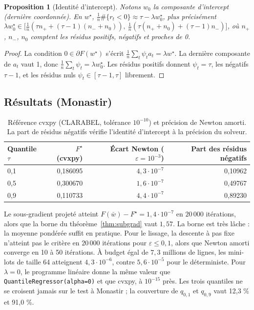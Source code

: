 \documentclass[11pt,a4paper]{article}
\newtheorem{proposition}[theorem]{Proposition}
\theoremstyle{remark}
\theoremstyle{definition}
\begin{document}
\begin{proposition}[Identité d'intercept]\label{prop:intercept}
Notons $w_0$ la composante d'intercept (dernière coordonnée). En $w^\star$, $\frac1n\#\{r_t<0\} \approx \tau - \lambda w_0^\star$, plus précisément
$\lambda w_0^\star \in \bigl[\tfrac1n(\tau n_+ + (\tau-1)(n_- + n_0)),\ \tfrac1n(\tau(n_+ + n_0) + (\tau-1)n_-)\bigr]$, où $n_+$, $n_-$, $n_0$ comptent les résidus positifs,
négatifs et proches de 0.
\end{proposition}
\begin{proof}
La condition $0 \in \partial F(w^\star)$ s'écrit $\frac1n\sum_t\psi_t a_t = \lambda w^\star$. La dernière composante de $a_t$ vaut 1, donc $\frac1n\sum_t\psi_t = \lambda w_0^\star$.
Les résidus positifs donnent $\psi_t = \tau$, les négatifs $\tau-1$, et les résidus nuls $\psi_t \in [\tau-1,\tau]$ librement.
\end{proof}

\subsection{Résultats (Monastir)}
\begin{table}[h]\centering
\begin{tabular}{lrrr}
\toprule
Quantile $\tau$ & $F^\star$ (cvxpy) & Écart Newton ($\varepsilon=10^{-3}$) & Part des résidus négatifs \\
\midrule
0,1 & 0,186095 & $4{,}3\cdot10^{-7}$ & 0,10962 \\
0,5 & 0,300670 & $1{,}6\cdot10^{-7}$ & 0,49767 \\
0,9 & 0,110733 & $4{,}4\cdot10^{-7}$ & 0,89230 \\
\bottomrule
\end{tabular}
\caption{Référence cvxpy (CLARABEL, tolérance $10^{-10}$) et précision de Newton amorti. La part de résidus négatifs vérifie
l'identité d'intercept à la précision du solveur.}
\end{table}
Le sous-gradient projeté atteint $F(\bar w) - F^\star = 1{,}4\cdot10^{-7}$ en $20\,000$ itérations, alors que la borne du théorème~\ref{thm:subgrad} vaut $1{,}57$.
La borne est très lâche : la moyenne pondérée suffit en pratique. Pour le lissage, la descente à pas fixe n'atteint pas le critère en $20\,000$ itérations
pour $\varepsilon \le 0{,}1$, alors que Newton amorti converge en 10 à 50 itérations.
À budget égal de $7{,}3$ millions de lignes, les mini-lots de taille 64 atteignent $4{,}3\cdot10^{-6}$, contre $5{,}6\cdot10^{-5}$ pour le déterministe.
Pour $\lambda = 0$, le programme linéaire donne la même valeur que \texttt{QuantileRegressor(alpha=0)} et que cvxpy, à $10^{-15}$ près.
Les trois quantiles ne se croisent jamais sur le test à Monastir ; la couverture de $q_{0,1}$ et $q_{0,9}$ vaut 12,3 \% et 91,0 \%.
\end{document}
